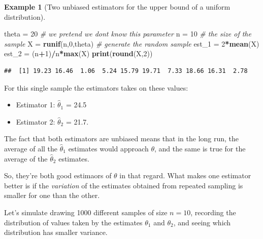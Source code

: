 \documentclass[
]{book}
\newenvironment{Shaded}{\begin{snugshade}}{\end{snugshade}}
\newcommand{\CommentTok}[1]{\textcolor[rgb]{0.56,0.35,0.01}{\textit{#1}}}
\newcommand{\DecValTok}[1]{\textcolor[rgb]{0.00,0.00,0.81}{#1}}
\newcommand{\FunctionTok}[1]{\textcolor[rgb]{0.13,0.29,0.53}{\textbf{#1}}}
\newcommand{\NormalTok}[1]{#1}
\newcommand{\OtherTok}[1]{\textcolor[rgb]{0.56,0.35,0.01}{#1}}
\newcommand{\SpecialCharTok}[1]{\textcolor[rgb]{0.81,0.36,0.00}{\textbf{#1}}}
\providecommand{\tightlist}{%
  \setlength{\itemsep}{0pt}\setlength{\parskip}{0pt}}
\theoremstyle{definition}
\theoremstyle{definition}
\newtheorem{example}{Example}[chapter]
\theoremstyle{definition}
\theoremstyle{definition}
\theoremstyle{remark}
\begin{document}
\begin{example}[Two unbiased estimators for the upper bound of a uniform distribution]
\begin{Shaded}
\begin{Highlighting}[]
\NormalTok{theta }\OtherTok{=} \DecValTok{20} \CommentTok{\# we pretend we don\textquotesingle{}t know this parameter}
\NormalTok{n }\OtherTok{=} \DecValTok{10} \CommentTok{\# the size of the sample}
\NormalTok{X }\OtherTok{=} \FunctionTok{runif}\NormalTok{(n,}\DecValTok{0}\NormalTok{,theta) }\CommentTok{\# generate the random sample}
\NormalTok{est\_1 }\OtherTok{=} \DecValTok{2}\SpecialCharTok{*}\FunctionTok{mean}\NormalTok{(X)}
\NormalTok{est\_2 }\OtherTok{=}\NormalTok{ (n}\SpecialCharTok{+}\DecValTok{1}\NormalTok{)}\SpecialCharTok{/}\NormalTok{n}\SpecialCharTok{*}\FunctionTok{max}\NormalTok{(X)}
\FunctionTok{print}\NormalTok{(}\FunctionTok{round}\NormalTok{(X,}\DecValTok{2}\NormalTok{))}
\end{Highlighting}
\end{Shaded}

\begin{verbatim}
##  [1] 19.23 16.46  1.06  5.24 15.79 19.71  7.33 18.66 16.31  2.78
\end{verbatim}

For this single sample the estimators takes on these values:

\begin{itemize}
\tightlist
\item
  Estimator 1: \(\hat{\theta}_1\) = 24.5
\item
  Estimator 2: \(\hat{\theta}_2\) = 21.7.
\end{itemize}

The fact that both estimators are unbiased means that in the long run, the average of all the \(\hat{\theta}_1\) estimates would approach \(\theta\), and the same is true for the average of the \(\hat{\theta}_2\) estimates.

So, they're both good estimaors of \(\theta\) in that regard. What makes one estimator better is if the \emph{variation} of the estimates obtained from repeated sampling is smaller for one than the other.

Let's simulate drawing 1000 different samples of size \(n = 10\), recording the distribution of values taken by the estimates \(\theta_1\) and \(\theta_2\), and seeing which distribution has smaller variance.


\end{example}
\end{document}
